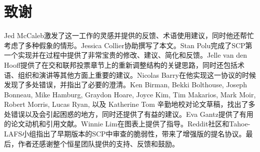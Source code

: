 \section{致谢}

Jed McCaleb激发了这一工作的灵感并提供的反馈、术语使用建议，同时他还帮忙考虑了多种假象的情形。Jessica Collier协助撰写了本文。Stan Polu完成了SCP第一个实现并在过程中提供了非常宝贵的修改、建议、简化和反馈。Jelle van den Hooff提供了在{\quorum}交和联邦投票章节上的重新调整结构的关键思路，同时还包括术语、组织和演讲等其他方面上重要的建议。Nicolas Barry在他实现这一协议的时候发现了多处错误，并指出了必要的澄清。Ken Birman, Bekki Bolthouse, Joseph Bonneau, Mike Hamburg, Graydon Hoare, Joyce Kim, Tim Makarios, Mark Moir, Robert Morris, Lucas Ryan, 以及 Katherine Tom 辛勤地校对论文草稿，找出了多处错误以及会引起困惑的地方，同时还提供了有益的建议。Eva Gantz提供了有用的论文动机和引用文献。Winnie Lim在图表上提供了指导。Reddit社区和Tahoe-LAFS小组指出了早期版本的SCP中审查的脆弱性，带来了增强版的提名协议。最后，作者还感谢整个恒星团队提供的支持、反馈和鼓励。